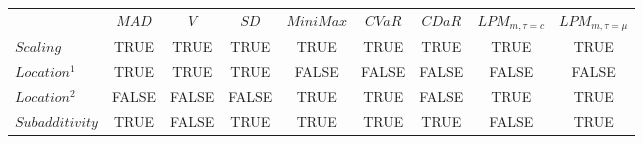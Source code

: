 {\tiny
{}
{
}{
\FL
\begin{tabular*}{1\textwidth}{@{\extracolsep{\fill}}lcccccccc}
& \multicolumn{1}{c}{\boldmath{}\textbf{$MAD$}\unboldmath{}} & \multicolumn{1}{c}{\boldmath{}\textbf{$V$}\unboldmath{}} & \multicolumn{1}{c}{\boldmath{}\textbf{$SD$}\unboldmath{}} & \multicolumn{1}{c}{\boldmath{}\textbf{$MiniMax$}\unboldmath{}} & \multicolumn{1}{c}{\boldmath{}\textbf{$CVaR$}\unboldmath{}} & \multicolumn{1}{c}{\boldmath{}\textbf{$CDaR$}\unboldmath{}} & \multicolumn{1}{c}{\boldmath{}\textbf{$LPM_{m,\tau=c}$}\unboldmath{}} & \multicolumn{1}{c}{\boldmath{}\textbf{$LPM_{m,\tau=\mu}$}\unboldmath{}} \\
\boldmath{}\textbf{$Scaling$}\unboldmath{} & TRUE  & TRUE  & TRUE  & TRUE  & TRUE  & TRUE  & TRUE  & TRUE \\
\boldmath{}\textbf{$Location^{1}$}\unboldmath{} & TRUE  & TRUE  & TRUE  & FALSE & FALSE & FALSE & FALSE  & FALSE \\
\boldmath{}\textbf{$Location^{2}$}\unboldmath{} & FALSE & FALSE & FALSE & TRUE  & TRUE  & FALSE & TRUE & TRUE \\
\boldmath{}\textbf{$Subadditivity$}\unboldmath{} & TRUE  & FALSE & TRUE  & TRUE  & TRUE  & TRUE  & FALSE & TRUE \\
\end{tabular*}
\LL
}}
